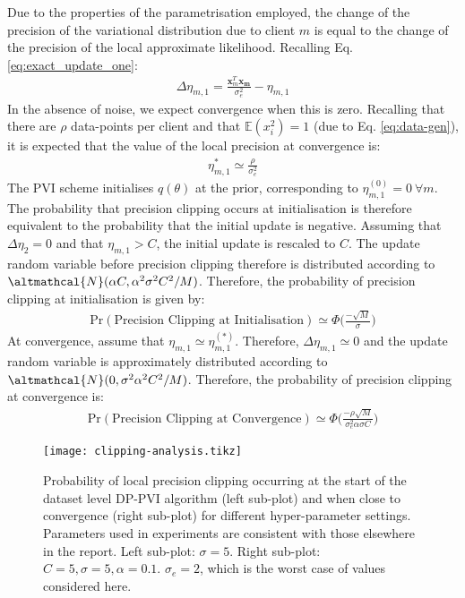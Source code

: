 Due to the properties of the parametrisation employed, the change of the precision of the variational distribution due to client $m$ is equal to the change of the precision of the local approximate likelihood. Recalling Eq. \eqref{eq:exact_update_one}:
\begin{align}
\Delta \eta_{m, 1} = \frac{\bm{x}_m ^T \bm{x_m}}{\sigma_e^2} - \eta_{m, 1}
\end{align}
In the absence of noise, we expect convergence when this is zero. Recalling that there are $\rho$ data-points per client and that $\mathbb{E}(x_{i}^2) = 1$ (due to Eq. \eqref{eq:data-gen}), it is expected that the value of the local precision at convergence is:
\begin{align}
\eta_{m, 1}^* \simeq \frac{\rho}{\sigma_e^2} 
\end{align}
The PVI scheme initialises $q(\theta)$ at the prior, corresponding to $\eta^{(0)}_{m, 1} = 0\ \forall m$. The probability that precision clipping occurs at initialisation is therefore equivalent to the probability that the initial update is negative. Assuming that $\Delta \eta_2 = 0$ and that $\eta_{m, 1} > C$,  the initial update is rescaled to $C$. The update random variable before precision clipping therefore is distributed according to $\altmathcal{N}(\alpha C, \alpha^2 \sigma^2 C^2/M)$. Therefore, the probability of precision clipping at initialisation is given by:
\begin{align}
\text{Pr}(\text{Precision Clipping at Initialisation}) \simeq \Phi \Big(\frac{-\sqrt{M} }{\sigma}\Big)
\end{align}
At convergence, assume that $\eta_{m, 1} \simeq \eta_{m, 1}^{(*)}$. Therefore, $\Delta \eta_{m, 1} \simeq 0$ and the update random variable is approximately distributed according to $\altmathcal{N}(0, \sigma^2 \alpha^2 C^2/M)$. Therefore, the probability of precision clipping at convergence is:
\begin{align}
\text{Pr}(\text{Precision Clipping at Convergence}) \simeq \Phi \Big(\frac{- \rho \sqrt{M} }{\sigma_e^2 \alpha \sigma C}\Big)
\end{align}

\begin{figure}
	\texttt{[image: clipping-analysis.tikz]}
	\centering
	\caption{\label{fig:invalid-clipping} Probability of local precision clipping occurring at the start of the dataset level DP-PVI algorithm (left sub-plot) and when close to convergence (right sub-plot) for different hyper-parameter settings. Parameters used in experiments are consistent with those elsewhere in the report. Left sub-plot: $\sigma = 5$. Right sub-plot: $C=5, \sigma=5, \alpha = 0.1$. $\sigma_e = 2$, which is the worst case of values considered here.}
\end{figure}

